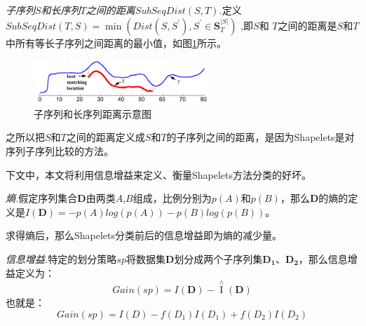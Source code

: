 \begin{mydef}
\emph{子序列$S$和长序列$T$之间的距离$SubSeqDist(S,T)$.}定义$SubSeqDist\left( {T,S} \right) = \min \left( {Dist\left( {S,{S^{'}}} \right),{S^{'}} \in \bm{S}_T^{\left| S \right|}} \right)$ ,即$S$和 $T$之间的距离是$S$和$T$中所有等长子序列之间距离的最小值，如图\ref{fig:14}所示。
\end{mydef}

\begin{figure}[h]
  \centering
  \includegraphics[width=0.6\textwidth]{./figure/subdist.PNG}
  \caption{子序列和长序列距离示意图}\label{fig:14}
\end{figure}

之所以把$S$和$T$之间的距离定义成$S$和$T$的子序列之间的距离，是因为Shapelets是对序列子序列比较的方法。

下文中，本文将利用信息增益来定义、衡量Shapelets方法分类的好坏。

\begin{mydef}
\emph{熵.}假定序列集合$\bm{D}$由两类$A$,$B$组成，比例分别为$p(A)$和$p(B)$，那么$\bm{D}$的熵的定义是$I(\bm{D}) = -p(A)log(p(A))-p(B)log(p(B))$。
\end{mydef}

求得熵后，那么Shapelets分类前后的信息增益即为熵的减少量。

\begin{mydef}
    \emph{信息增益.}特定的划分策略$sp$将数据集$\bm{D}$划分成两个子序列集$\bm{D_1}$、$\bm{D_2}$，那么信息增益定义为：
    \begin{equation}\label{equ:10}
      Gain\left( {sp} \right) = I\left( \bm{D} \right) - \mathop I\limits^ \wedge  \left( \bm{D} \right)
    \end{equation}
    也就是：
    \begin{equation}\label{equ:11}
      Gain\left( {sp} \right) = I\left( D \right) - f\left( {{D_1}} \right)I\left( {{D_1}} \right) + f\left( {{D_2}} \right)I\left( {{D_2}} \right)
    \end{equation}
\end{mydef}

